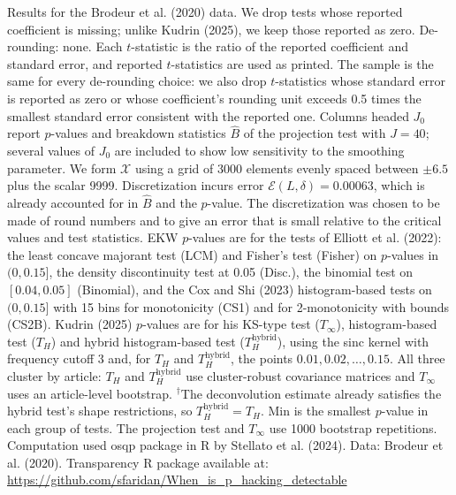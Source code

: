 \begin{table}[htbp]
\medskip
\begin{minipage}{\linewidth}
Results for the Brodeur et al. (2020) data. We drop tests whose reported coefficient is missing; unlike Kudrin (2025), we keep those reported as zero.
De-rounding: none. Each $t$-statistic is the ratio of the reported coefficient and standard error, and reported $t$-statistics are used as printed.
The sample is the same for every de-rounding choice: we also drop $t$-statistics whose standard error is reported as zero or whose coefficient's rounding unit exceeds 0.5 times the smallest standard error consistent with the reported one.
Columns headed $J_0$ report $p$-values and breakdown statistics $\widehat{B}$ of the projection test with $J=40$; several values of $J_0$ are included to show low sensitivity to the smoothing parameter.
We form $\mathcal{X}$ using a grid of 3000 elements evenly spaced between $\pm 6.5$ plus the scalar 9999.
Discretization incurs error $\mathcal{E}(L,\delta)=0.00063$, which is already accounted for in $\widehat{B}$ and the $p$-value.
The discretization was chosen to be made of round numbers and to give an error that is small relative to the critical values and test statistics.
EKW $p$-values are for the tests of Elliott et al. (2022): the least concave majorant test (LCM) and Fisher's test (Fisher) on $p$-values in $(0,0.15]$, the density discontinuity test at 0.05 (Disc.), the binomial test on $[0.04,0.05]$ (Binomial), and the Cox and Shi (2023) histogram-based tests on $(0,0.15]$ with 15 bins for monotonicity (CS1) and for 2-monotonicity with bounds (CS2B).
Kudrin (2025) $p$-values are for his KS-type test ($T_\infty$), histogram-based test ($T_H$) and hybrid histogram-based test ($T_H^{\mathrm{hybrid}}$), using the sinc kernel with frequency cutoff 3 and, for $T_H$ and $T_H^{\mathrm{hybrid}}$, the points $0.01,0.02,\ldots,0.15$.
All three cluster by article: $T_H$ and $T_H^{\mathrm{hybrid}}$ use cluster-robust covariance matrices and $T_\infty$ uses an article-level bootstrap.
$^\dagger$The deconvolution estimate already satisfies the hybrid test's shape restrictions, so $T_H^{\mathrm{hybrid}}=T_H$.
Min is the smallest $p$-value in each group of tests.
The projection test and $T_\infty$ use 1000 bootstrap repetitions.
Computation used osqp package in R by Stellato et al. (2024). Data: Brodeur et al. (2020).
Transparency R package available at: \url{https://github.com/sfaridan/When_is_p_hacking_detectable}
\end{minipage}
\end{table}
